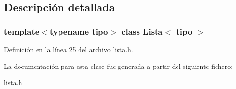 \subsection{Descripción detallada}
\subsubsection*{template$<$typename tipo$>$\newline
class Lista$<$ tipo $>$}



Definición en la línea 25 del archivo lista.\+h.



La documentación para esta clase fue generada a partir del siguiente fichero\+:\begin{DoxyCompactItemize}
\item 
lista.\+h\end{DoxyCompactItemize}
